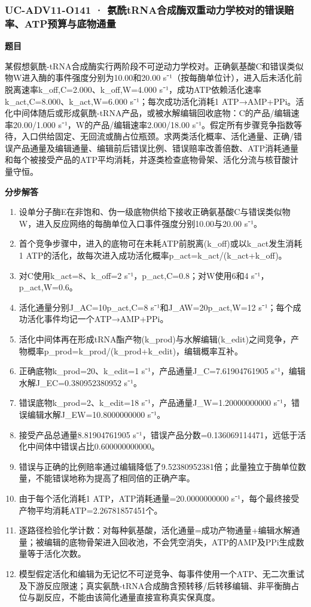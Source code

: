 \documentclass[UTF8,11pt,a4paper]{ctexart}
\begin{document}
\subsubsection*{UC-ADV11-O141 · 氨酰tRNA合成酶双重动力学校对的错误赔率、ATP预算与底物通量}
\noindent\textbf{题目}\par
某假想氨酰-tRNA合成酶实行两阶段不可逆动力学校对。正确氨基酸C和错误类似物W进入酶的事件强度分别为10.00和20.00 s⁻¹（按每酶单位计），进入后未活化前脱离速率k\_off,C=2.000、k\_off,W=4.000 s⁻¹，成功ATP依赖活化速率k\_act,C=8.000、k\_act,W=6.000 s⁻¹；每次成功活化消耗1 ATP→AMP+PPi。活化中间体随后或形成氨酰-tRNA产品，或被水解编辑回收底物：C的产品/编辑速率20.00/1.000 s⁻¹，W的产品/编辑速率2.000/18.00 s⁻¹。假定所有步骤竞争指数等待，入口供给固定、无回流或酶占位瓶颈。求两类活化概率、活化通量、正确/错误产品通量及编辑通量、编辑前后错误比例、错误赔率改善倍数、ATP消耗通量和每个被接受产品的ATP平均消耗，并逐类检查底物骨架、活化分流与核苷酸计量守恒。\par
\medskip\noindent\textbf{分步解答}
\begin{enumerate}
\item 设单分子酶E在非饱和、伪一级底物供给下接收正确氨基酸C与错误类似物W，进入反应网络的每酶单位入口事件强度分别10.00与20.00 s⁻¹。
\item 首个竞争步骤中，进入的底物可在未耗ATP前脱离(k\_off)或以k\_act发生消耗1 ATP的活化，故每次进入成功活化概率p\_act=k\_act/(k\_act+k\_off)。
\item 对C使用k\_act=8、k\_off=2 s⁻¹，p\_act,C=0.8；对W使用6和4 s⁻¹，p\_act,W=0.6。
\item 活化通量分别J\_AC=10p\_act,C=8 s⁻¹和J\_AW=20p\_act,W=12 s⁻¹；每个成功活化事件均记一个ATP→AMP+PPi。
\item 活化中间体再在形成tRNA酯产物(k\_prod)与水解编辑(k\_edit)之间竞争，产物概率p\_prod=k\_prod/(k\_prod+k\_edit)，编辑概率互补。
\item 正确底物k\_prod=20、k\_edit=1 s⁻¹，产品通量J\_C=7.61904761905 s⁻¹，编辑水解J\_EC=0.380952380952 s⁻¹。
\item 错误底物k\_prod=2、k\_edit=18 s⁻¹，产品通量J\_W=1.20000000000 s⁻¹，错误编辑水解J\_EW=10.8000000000 s⁻¹。
\item 接受产品总通量8.81904761905 s⁻¹，错误产品分数=0.136069114471，远低于活化中间体中错误占比0.600000000000。
\item 错误与正确的比例赔率通过编辑降低了9.52380952381倍；此量独立于酶单位数量，不能错误地称为提高了相同倍的正确产率。
\item 由于每个活化消耗1 ATP，ATP消耗通量=20.0000000000 s⁻¹，每个最终接受产物平均消耗ATP=2.26781857451个。
\item 逐路径检验化学计数：对每种氨基酸，活化通量=成功产物通量+编辑水解通量；被编辑的底物骨架进入回收池，不会凭空消失，ATP的AMP及PPi生成数量等于活化次数。
\item 模型假定活化和编辑为无记忆不可逆竞争、每事件使用一个ATP、无二次重试及下游反应限速；真实氨酰-tRNA合成酶含预转移/后转移编辑、非平衡酶占位与副反应，不能由该简化通量直接宣称真实保真度。
\end{enumerate}
\end{document}
